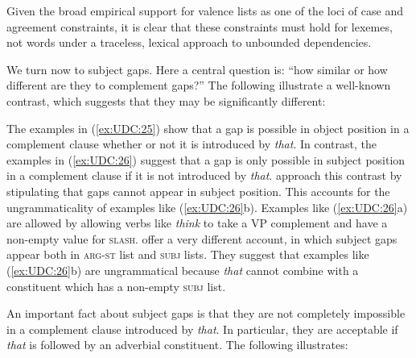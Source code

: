 \documentclass[output=paper,biblatex,babelshorthands,newtxmath,draftmode,colorlinks,citecolor=brown]{langscibook}
\begin{document}
Given the broad empirical support for valence lists as one of the loci
of case and agreement constraints, it is clear that these constraints
must hold for lexemes, not words under a traceless, lexical
approach to unbounded dependencies.



We\label{udc:page-subject-gaps-start} turn now to subject gaps. Here a central question is: ``how similar or
how different are they to complement gaps?'' The following illustrate a
well-known contrast, which suggests that they may be significantly
different:

\begin{exe} \ex \begin{xlist} \label{ex:UDC:25}

\end{xlist}
\end{exe}

\begin{exe} \ex \begin{xlist} \label{ex:UDC:26}

\end{xlist}
\end{exe}

\noindent
The examples in (\ref{ex:UDC:25}) show that a gap is possible in
object position in a complement clause whether or not it is introduced
by \emph{that}.
In contrast, the examples in (\ref{ex:UDC:26}) suggest
that a gap is only possible in subject position in a complement clause
if it is not introduced by
\emph{that}. \citet[Chapter~4.4]{Pollard:Sag:94} approach this
contrast by stipulating that gaps cannot appear in subject
position. This accounts for the ungrammaticality of examples like
(\ref{ex:UDC:26}b). Examples like (\ref{ex:UDC:26}a) are allowed by
allowing verbs like \textit{think} to take a VP complement and have a
non-empty value for
\textsc{slash}. \citet[Chapter~5.1.3]{Ginzburg:Sag:01} offer a very
different account, in which subject gaps appear both in
\textsc{arg-st} list and \textsc{subj} lists. They suggest that
examples like (\ref{ex:UDC:26}b) are ungrammatical because \emph{that}
cannot combine with a constituent which has a non-empty \textsc{subj}
list.

An important fact about subject gaps is that they are not completely
impossible in a complement clause introduced by \emph{that}. In
particular, they are acceptable if \emph{that} is followed by an
adverbial constituent. The following illustrates:
\end{document}
